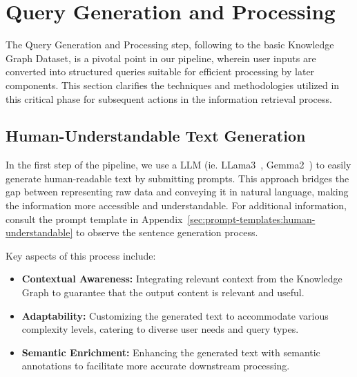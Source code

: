 \section{Query Generation and Processing}\label{sec:query-generation-and-processing}
The Query Generation and Processing step, following to the basic Knowledge Graph Dataset, is a pivotal point in our pipeline, wherein user inputs are converted into structured queries suitable for efficient processing by later components.
This section clarifies the techniques and methodologies utilized in this critical phase for subsequent actions in the information retrieval process.

\subsection{Human-Understandable Text Generation}\label{subsec:human-understandable-text-generation}
In the first step of the pipeline, we use a LLM (ie. LLama3~\cite{dubey2024llama3herdmodels}, Gemma2~\cite{gemmateam2024gemma2improvingopen}) to easily generate human-readable text by submitting prompts.
This approach bridges the gap between representing raw data and conveying it in natural language, making the information more accessible and understandable.
For additional information, consult the prompt template in Appendix~\ref{sec:prompt-templates:human-understandable} to observe the sentence generation process.

Key aspects of this process include:
\begin{itemize}
    \item \textbf{Contextual Awareness:} Integrating relevant context from the Knowledge Graph to guarantee that the output content is relevant and useful.
    \item \textbf{Adaptability:} Customizing the generated text to accommodate various complexity levels, catering to diverse user needs and query types.
    \item \textbf{Semantic Enrichment:} Enhancing the generated text with semantic annotations to facilitate more accurate downstream processing.
\end{itemize}

